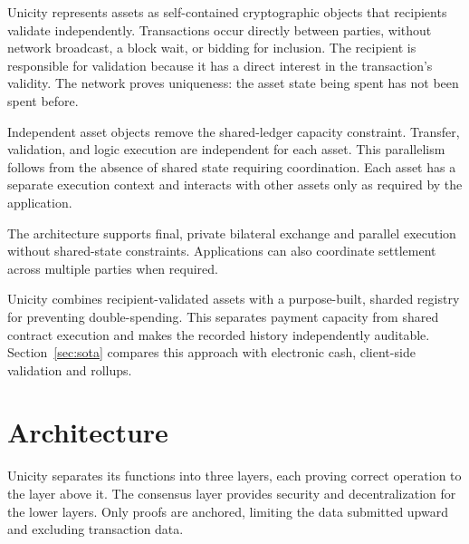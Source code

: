 Unicity represents assets as self-contained cryptographic objects that recipients validate independently. Transactions occur directly between parties, without network broadcast, a block wait, or bidding for inclusion. The recipient is responsible for validation because it has a direct interest in the transaction's validity. The network proves uniqueness: the asset state being spent has not been spent before.

Independent asset objects remove the shared-ledger capacity constraint. Transfer, validation, and logic execution are independent for each asset. This parallelism follows from the absence of shared state requiring coordination. Each asset has a separate execution context and interacts with other assets only as required by the application.

The architecture supports final, private bilateral exchange and parallel execution without shared-state constraints. Applications can also coordinate settlement across multiple parties when required.

Unicity combines recipient-validated assets with a purpose-built, sharded registry for preventing double-spending. This separates payment capacity from shared contract execution and makes the recorded history independently auditable. Section~\ref{sec:sota} compares this approach with electronic cash, client-side validation and rollups.

\section{Architecture}

Unicity separates its functions into three layers, each proving correct operation to the layer above it. The consensus layer provides security and decentralization for the lower layers. Only proofs are anchored, limiting the data submitted upward and excluding transaction data.


